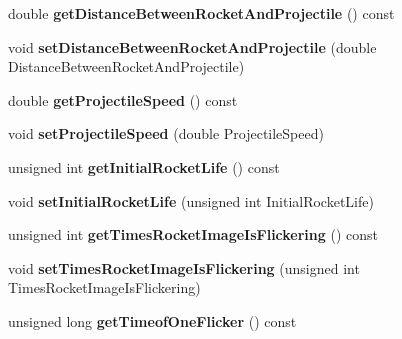 \begin{DoxyCompactItemize}
\item 
double {\bfseries get\+Distance\+Between\+Rocket\+And\+Projectile} () const \hypertarget{classGameConfiguration_adac56f6b7bd6c6867b659f5b249cd32f}{}\label{classGameConfiguration_adac56f6b7bd6c6867b659f5b249cd32f}

\item 
void {\bfseries set\+Distance\+Between\+Rocket\+And\+Projectile} (double Distance\+Between\+Rocket\+And\+Projectile)\hypertarget{classGameConfiguration_a0e20e5002bf99765f93ed8b5246e1ba3}{}\label{classGameConfiguration_a0e20e5002bf99765f93ed8b5246e1ba3}

\item 
double {\bfseries get\+Projectile\+Speed} () const \hypertarget{classGameConfiguration_ad993486abf46a54ae53dd7511a8ed485}{}\label{classGameConfiguration_ad993486abf46a54ae53dd7511a8ed485}

\item 
void {\bfseries set\+Projectile\+Speed} (double Projectile\+Speed)\hypertarget{classGameConfiguration_a97eecc15961cd583ed6c65cfa482529c}{}\label{classGameConfiguration_a97eecc15961cd583ed6c65cfa482529c}

\item 
unsigned int {\bfseries get\+Initial\+Rocket\+Life} () const \hypertarget{classGameConfiguration_a0715156a35713b5e9ac0e86571e2581b}{}\label{classGameConfiguration_a0715156a35713b5e9ac0e86571e2581b}

\item 
void {\bfseries set\+Initial\+Rocket\+Life} (unsigned int Initial\+Rocket\+Life)\hypertarget{classGameConfiguration_a07661f40535440be2e16e1789f2cbf0b}{}\label{classGameConfiguration_a07661f40535440be2e16e1789f2cbf0b}

\item 
unsigned int {\bfseries get\+Times\+Rocket\+Image\+Is\+Flickering} () const \hypertarget{classGameConfiguration_a035411318454ed12fb5c370377a20544}{}\label{classGameConfiguration_a035411318454ed12fb5c370377a20544}

\item 
void {\bfseries set\+Times\+Rocket\+Image\+Is\+Flickering} (unsigned int Times\+Rocket\+Image\+Is\+Flickering)\hypertarget{classGameConfiguration_a66004b697ef7a6e55e33fc93742ef9ac}{}\label{classGameConfiguration_a66004b697ef7a6e55e33fc93742ef9ac}

\item 
unsigned long {\bfseries get\+Timeof\+One\+Flicker} () const \hypertarget{classGameConfiguration_a4193af7729d1cbfa355f075e0b73c528}{}\label{classGameConfiguration_a4193af7729d1cbfa355f075e0b73c528}


\end{DoxyCompactItemize}
